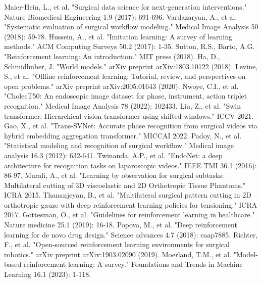 \documentclass[conference]{IEEEtran}
\begin{document}
\begin{thebibliography}{00}
 Maier-Hein, L., et al. "Surgical data science for next-generation interventions." Nature Biomedical Engineering 1.9 (2017): 691-696.
 Vardazaryan, A., et al. "Systematic evaluation of surgical workflow modeling." Medical Image Analysis 50 (2018): 59-78.
 Hussein, A., et al. "Imitation learning: A survey of learning methods." ACM Computing Surveys 50.2 (2017): 1-35.
 Sutton, R.S., Barto, A.G. "Reinforcement learning: An introduction." MIT press (2018).
 Ha, D., Schmidhuber, J. "World models." arXiv preprint arXiv:1803.10122 (2018).
 Levine, S., et al. "Offline reinforcement learning: Tutorial, review, and perspectives on open problems." arXiv preprint arXiv:2005.01643 (2020).
 Nwoye, C.I., et al. "CholecT50: An endoscopic image dataset for phase, instrument, action triplet recognition." Medical Image Analysis 78 (2022): 102433.
 Liu, Z., et al. "Swin transformer: Hierarchical vision transformer using shifted windows." ICCV 2021.
 Gao, X., et al. "Trans-SVNet: Accurate phase recognition from surgical videos via hybrid embedding aggregation transformer." MICCAI 2022.
 Padoy, N., et al. "Statistical modeling and recognition of surgical workflow." Medical image analysis 16.3 (2012): 632-641.
 Twinanda, A.P., et al. "EndoNet: a deep architecture for recognition tasks on laparoscopic videos." IEEE TMI 36.1 (2016): 86-97.
 Murali, A., et al. "Learning by observation for surgical subtasks: Multilateral cutting of 3D viscoelastic and 2D Orthotropic Tissue Phantoms." ICRA 2015.
 Thananjeyan, B., et al. "Multilateral surgical pattern cutting in 2D orthotropic gauze with deep reinforcement learning policies for tensioning." ICRA 2017.
 Gottesman, O., et al. "Guidelines for reinforcement learning in healthcare." Nature medicine 25.1 (2019): 16-18.
 Popova, M., et al. "Deep reinforcement learning for de novo drug design." Science advances 4.7 (2018): eaap7885.
 Richter, F., et al. "Open-sourced reinforcement learning environments for surgical robotics." arXiv preprint arXiv:1903.02090 (2019).
 Moerland, T.M., et al. "Model-based reinforcement learning: A survey." Foundations and Trends in Machine Learning 16.1 (2023): 1-118.
\end{thebibliography}
\end{document}
